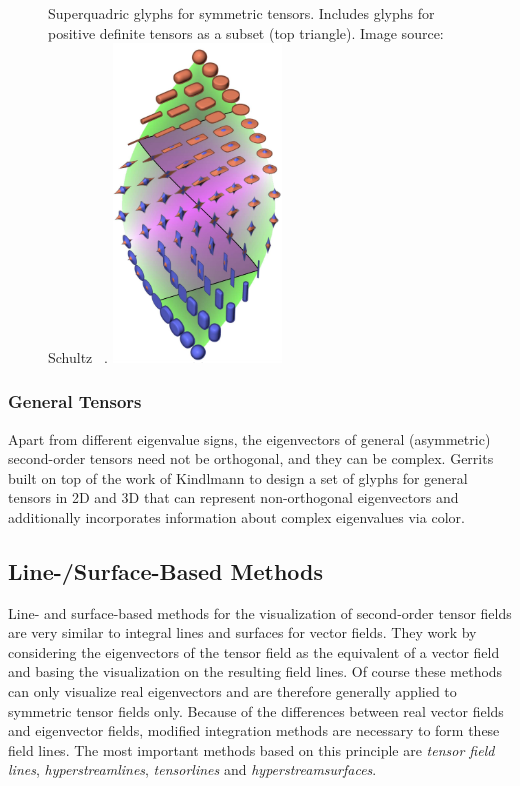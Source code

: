 \begin{figure}
    \begin{captionbeside}
        {Superquadric glyphs for symmetric tensors. Includes glyphs for positive
         definite tensors as a subset (top triangle). Image source: Schultz
         \etal~\cite{Schultz2010a}.}
        \includegraphics[width=0.4\textwidth]{figures/symmetric_tensor_glyphs.png}
    \end{captionbeside}
    \label{fig:tensor_glyphs}
\end{figure}

\subsubsection{General Tensors} %
%
Apart from different eigenvalue signs, the eigenvectors of general (asymmetric)
second-order tensors need not be orthogonal, and they can be complex.
%
Gerrits \etal~\cite{Gerrits2017} built on top of the work of Kindlmann \etal to
design a set of glyphs for general tensors in \ac{2D} and \ac{3D} that can
represent non-orthogonal eigenvectors and additionally incorporates information
about complex eigenvalues via color.
%

\subsection{Line-/Surface-Based Methods} %
\label{sub:tensor_line_surface_based}
%
Line- and surface-based methods for the visualization of second-order tensor
fields are very similar to integral lines and surfaces for vector fields.
%
They work by considering the eigenvectors of the tensor field as the equivalent
of a vector field and basing the visualization on the resulting field lines.
%
Of course these methods can only visualize real eigenvectors and are therefore
generally applied to symmetric tensor fields only.
%
Because of the differences between real vector fields and eigenvector fields,
modified integration methods are necessary to form these field lines.
%
The most important methods based on this principle are \emph{tensor field
lines}, \emph{hyperstreamlines}, \emph{tensorlines} and
\emph{hyperstreamsurfaces}.
%

